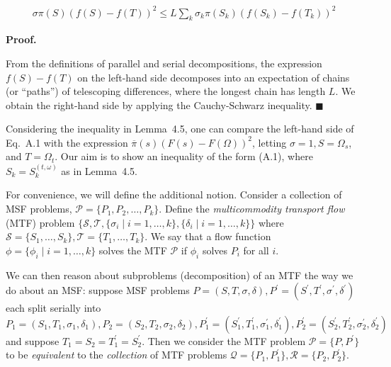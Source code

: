 \[\begin{gathered}
\sigma\pi(S)(f(S)-f(T))^{2}\leq L\sum_{k}\sigma_{k}\pi(S_{k})(f(S_{k})-f(T_{k}))^{2}
\end{gathered}\]






\par\medskip\noindent\textbf{Proof.}\par



From the definitions of parallel and serial decompositions, the expression $f(S)-f(T)$ on the left-hand side decomposes into an expectation of chains (or “paths”) of telescoping differences, where the longest chain has length $L$. We obtain the right-hand side by applying the Cauchy-Schwarz inequality.
\ensuremath{\blacksquare}\par





Considering the inequality in Lemma 4.5, one can compare the left-hand side of Eq. A.1 with the expression $\overline{\pi}(s)(F(s)-F(\Omega))^{2}$, letting $\sigma=1,S=\Omega_{s}$, and $T=\Omega_{t}$. Our aim is to show an inequality of the form (A.1), where $S_{k}=S_{k}^{(t,\omega)}$ as in Lemma 4.5.\par




For convenience, we will define the additional notion. Consider a collection of MSF problems, $\mathcal{P}=\{P_{1},P_{2},\dots,P_{k}\}$. Define the \emph{multicommodity transport flow} (MTF) problem $\{\mathcal{S},\mathcal{T},\{\sigma_{i}\mid i=1,\dots,k\},\{\delta_{i}\mid i=1,\dots,k\}\}$ where $\mathcal{S}=\{S_{1},\dots,S_{k}\},\mathcal{T}=\{T_{1},\dots,T_{k}\}$. We say that a flow function $\phi=\{\phi_{i}\mid i=1,\dots,k\}$ solves the MTF $\mathcal{P}$ if $\phi_{i}$ solves $P_{i}$ for all $i$.\par




We can then reason about subproblems (decomposition) of an MTF the way we do about an MSF: suppose MSF problems $P=(S,T,\sigma,\delta),P^{\prime}=(S^{\prime},T^{\prime},\sigma^{\prime},\delta^{\prime})$ each split serially into $P_{1}=(S_{1},T_{1},\sigma_{1},\delta_{1}),P_{2}=(S_{2},T_{2},\sigma_{2},\delta_{2}),P^{\prime}_{1}=(S^{\prime}_{1},T^{\prime}_{1},\sigma^{\prime}_{1},\delta^{\prime}_{1}),P^{\prime}_{2}=(S^{\prime}_{2},T^{\prime}_{2},\sigma^{\prime}_{2},\delta^{\prime}_{2})$ and suppose $T_{1}=S_{2}=T^{\prime}_{1}=S^{\prime}_{2}$. Then we consider the MTF problem $\mathcal{P}=\{P,P^{\prime}\}$ to be \emph{equivalent} to the \emph{collection} of MTF problems $\mathcal{Q}=\{P_{1},P^{\prime}_{1}\},\mathcal{R}=\{P_{2},P^{\prime}_{2}\}$.\par




